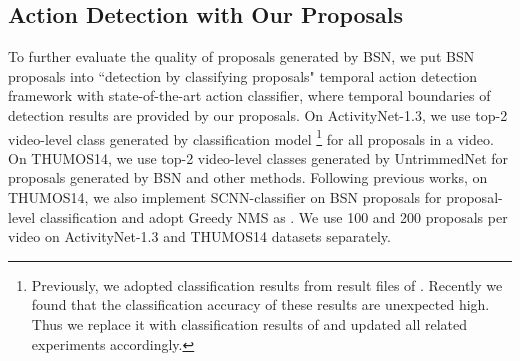 \documentclass[runningheads]{llncs}
\begin{document}
\subsection{Action Detection with  Our Proposals}

To further evaluate the quality of proposals generated by BSN, we put BSN proposals into ``detection by classifying proposals" temporal action detection framework with state-of-the-art action classifier, where  temporal boundaries of detection results are provided by our proposals.
%
On ActivityNet-1.3, we use top-2 video-level class generated by classification model \cite{zhao2017cuhk}\footnote{Previously, we adopted classification results from result files of \cite{wang2016uts}. Recently we found that the classification accuracy of these results are unexpected high. Thus we replace it with classification results of \cite{zhao2017cuhk} and updated all related experiments accordingly.}  for all proposals in a video. %
On THUMOS14, we use top-2 video-level classes generated by UntrimmedNet \cite{wang2017untrimmednets} for proposals generated by BSN and other methods.%
Following  previous works,  on THUMOS14, we also implement SCNN-classifier on BSN proposals for proposal-level classification and  adopt Greedy NMS  as \cite{shou2016action}.
We use 100 and 200 proposals per video on ActivityNet-1.3  and THUMOS14 datasets separately.
\end{document}
